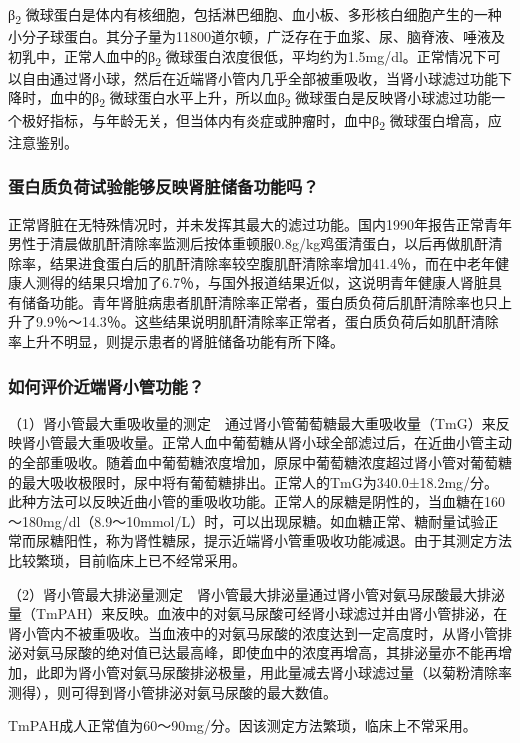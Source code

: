 β\textsubscript{2}
微球蛋白是体内有核细胞，包括淋巴细胞、血小板、多形核白细胞产生的一种小分子球蛋白。其分子量为11800道尔顿，广泛存在于血浆、尿、脑脊液、唾液及初乳中，正常人血中的β\textsubscript{2}
微球蛋白浓度很低，平均约为1.5mg/dl。正常情况下可以自由通过肾小球，然后在近端肾小管内几乎全部被重吸收，当肾小球滤过功能下降时，血中的β\textsubscript{2}
微球蛋白水平上升，所以血β\textsubscript{2}
微球蛋白是反映肾小球滤过功能一个极好指标，与年龄无关，但当体内有炎症或肿瘤时，血中β\textsubscript{2}
微球蛋白增高，应注意鉴别。

\subsubsection{蛋白质负荷试验能够反映肾脏储备功能吗？}

正常肾脏在无特殊情况时，并未发挥其最大的滤过功能。国内1990年报告正常青年男性于清晨做肌酐清除率监测后按体重顿服0.8g/kg鸡蛋清蛋白，以后再做肌酐清除率，结果进食蛋白后的肌酐清除率较空腹肌酐清除率增加41.4％，而在中老年健康人测得的结果只增加了6.7％，与国外报道结果近似，这说明青年健康人肾脏具有储备功能。青年肾脏病患者肌酐清除率正常者，蛋白质负荷后肌酐清除率也只上升了9.9％～14.3％。这些结果说明肌酐清除率正常者，蛋白质负荷后如肌酐清除率上升不明显，则提示患者的肾脏储备功能有所下降。

\subsubsection{如何评价近端肾小管功能？}

（1）肾小管最大重吸收量的测定　通过肾小管葡萄糖最大重吸收量（TmG）来反映肾小管最大重吸收量。正常人血中葡萄糖从肾小球全部滤过后，在近曲小管主动的全部重吸收。随着血中葡萄糖浓度增加，原尿中葡萄糖浓度超过肾小管对葡萄糖的最大吸收极限时，尿中将有葡萄糖排出。正常人的TmG为340.0±18.2mg/分。此种方法可以反映近曲小管的重吸收功能。正常人的尿糖是阴性的，当血糖在160～180mg/dl（8.9～10mmol/L）时，可以出现尿糖。如血糖正常、糖耐量试验正常而尿糖阳性，称为肾性糖尿，提示近端肾小管重吸收功能减退。由于其测定方法比较繁琐，目前临床上已不经常采用。

（2）肾小管最大排泌量测定　肾小管最大排泌量通过肾小管对氨马尿酸最大排泌量（TmPAH）来反映。血液中的对氨马尿酸可经肾小球滤过并由肾小管排泌，在肾小管内不被重吸收。当血液中的对氨马尿酸的浓度达到一定高度时，从肾小管排泌对氨马尿酸的绝对值已达最高峰，即使血中的浓度再增高，其排泌量亦不能再增加，此即为肾小管对氨马尿酸排泌极量，用此量减去肾小球滤过量（以菊粉清除率测得），则可得到肾小管排泌对氨马尿酸的最大数值。

TmPAH成人正常值为60～90mg/分。因该测定方法繁琐，临床上不常采用。


